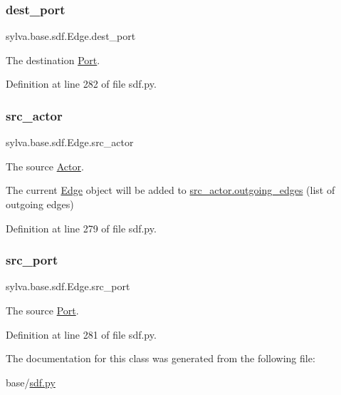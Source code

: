 \subsubsection{\texorpdfstring{dest\+\_\+port}{dest\_port}}
{\footnotesize\ttfamily sylva.\+base.\+sdf.\+Edge.\+dest\+\_\+port}



The destination \hyperlink{classsylva_1_1base_1_1sdf_1_1_port}{Port}. 



Definition at line 282 of file sdf.\+py.

\mbox{\label{classsylva_1_1base_1_1sdf_1_1_edge_a669757129f2efcb76625f90992afd7db}} 
\subsubsection{\texorpdfstring{src\+\_\+actor}{src\_actor}}
{\footnotesize\ttfamily sylva.\+base.\+sdf.\+Edge.\+src\+\_\+actor}



The source \hyperlink{classsylva_1_1base_1_1sdf_1_1_actor}{Actor}. 

The current \hyperlink{classsylva_1_1base_1_1sdf_1_1_edge}{Edge} object will be added to \hyperlink{classsylva_1_1base_1_1sdf_1_1_actor_a11fdbcea1b73039bad4996f5380277d8}{src\+\_\+actor.outgoing\+\_\+edges} (list of outgoing edges) 

Definition at line 279 of file sdf.\+py.

\mbox{\label{classsylva_1_1base_1_1sdf_1_1_edge_a824af9d2da5c0fadcc08bba783a29f15}} 
\subsubsection{\texorpdfstring{src\+\_\+port}{src\_port}}
{\footnotesize\ttfamily sylva.\+base.\+sdf.\+Edge.\+src\+\_\+port}



The source \hyperlink{classsylva_1_1base_1_1sdf_1_1_port}{Port}. 



Definition at line 281 of file sdf.\+py.



The documentation for this class was generated from the following file\+:\begin{DoxyCompactItemize}
\item 
base/\hyperlink{sdf_8py}{sdf.\+py}\end{DoxyCompactItemize}
